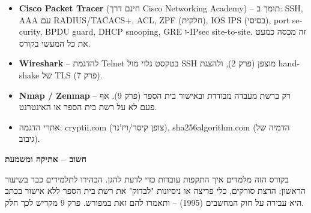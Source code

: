 \documentclass[11pt]{article}
\newcommand{\enLR}[1]{\textenglish{#1}}
\newcommand{\boxtitle}[1]{{\bfseries\color{boxti}#1}}
\newenvironment{mistakebox}{\colorlet{boxti}{misti}\begin{mdframed}[backgroundcolor=misbg,linecolor=misfr,rightline=true,leftline=false,topline=false,bottomline=false,linewidth=2pt,innertopmargin=6pt,innerbottommargin=6pt,innerleftmargin=8pt,innerrightmargin=8pt,skipabove=6pt,skipbelow=6pt]}{\end{mdframed}}
\begin{document}
\begin{itemize}
\item \textbf{\enLR{Cisco Packet Tracer}} (חינם דרך \enLR{Cisco Networking Academy)} – תומך ב: \enLR{SSH, AAA} עם \enLR{RADIUS/TACACS+, ACL, ZPF} (חלקית), \enLR{IOS IPS} (בסיסי), \enLR{port security, BPDU guard, DHCP snooping, GRE} ו-\enLR{IPsec site-to-site.} זה מכסה כמעט את כל המעשי בקורס.
\item \textbf{\enLR{Wireshark}} – להדגמת \enLR{Telnet} בטקסט גלוי מול \enLR{SSH} מוצפן (פרק \enLR{2)}, ולהצגת \enLR{handshake} של \enLR{TLS} (פרק \enLR{7).}
\item \textbf{\enLR{Nmap / Zenmap}} – רק ברשת מעבדה מבודדת ובאישור בית הספר (פרק \enLR{9).} אף פעם לא על רשת בית הספר או האינטרנט.
\item אתרי הדגמה: \enLR{cryptii.com} (צופן קיסר/ויז'נר), \enLR{sha256algorithm.com} (הדמיה של גיבוב).
\end{itemize}

\begin{mistakebox}\boxtitle{חשוב – אתיקה ומשמעת}\par  בקורס הזה מלמדים איך התקפות עובדות כדי לדעת להגן. הבהירו לתלמידים כבר בשיעור הראשון: הרצת סורקים, כלי פריצה או ניסיונות "לבדוק" את רשת בית הספר ללא אישור בכתב היא עבירה על חוק המחשבים \enLR{(1995)} – ותאמרו להם זאת במפורש. פרק \enLR{9} מקדיש לכך חלק.\end{mistakebox}
\end{document}
